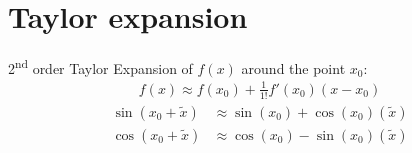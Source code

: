 \section{Taylor expansion}\label{s:taylor}
2\textsuperscript{nd} order Taylor Expansion of $f(x)$ around the point $x_0$:
\begin{align*}
	f(x)\approx f(x_0)+\frac{1}{1! }f' (x_0)(x-x_0)
\end{align*}
\begin{align*}
\sin(x_0 + \tilde{x}) &\approx \sin(x_0) + \cos(x_0)(\tilde{x})\\
\cos(x_0 + \tilde{x}) &\approx \cos(x_0) - \sin(x_0)(\tilde{x})\\
\end{align*}